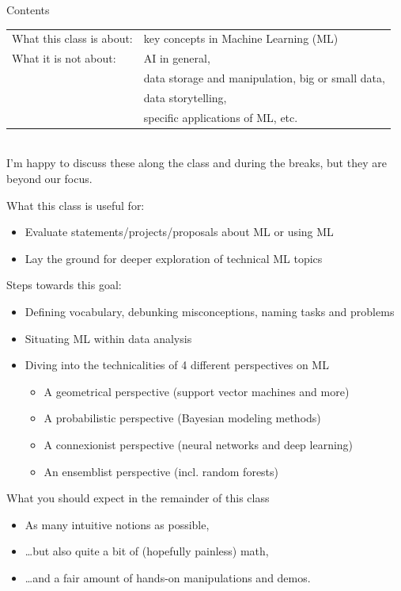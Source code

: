 \documentclass[10pt,a4paper,t,aspectratio=1610,dvipsnames]{beamer}
\begin{document}
\begin{frame}{Contents}
\begin{tabular}{@{}ll}
	What this class is about: & key concepts in Machine Learning (ML)\\
	What it is not about: & AI in general,\\
	& data storage and manipulation, big or small data,\\
	& data storytelling,\\
	& specific applications of ML, etc.
\end{tabular}\\
I'm happy to discuss these along the class and during the breaks, but they are beyond our focus.

\vspace{2em}
\indent What this class is useful for:
\begin{itemize}
	\item[] Evaluate statements/projects/proposals about ML or using ML
	\item[] Lay the ground for deeper exploration of technical ML topics
\end{itemize}

\vspace{2em}
Steps towards this goal:
\begin{itemize}
	\item Defining vocabulary, debunking misconceptions, naming tasks and problems
	\item Situating ML within data analysis
	\item Diving into the technicalities of 4 different perspectives on ML
	\begin{itemize}
		\item A geometrical perspective (support vector machines and more)
		\item A probabilistic perspective (Bayesian modeling methods)
		\item A connexionist perspective (neural networks and deep learning)
		\item An ensemblist perspective (incl. random forests)
	\end{itemize}
\end{itemize}
\end{frame}

\begin{frame}{What you should expect in the remainder of this class}
\begin{itemize}
	\item As many intuitive notions as possible,
	\item \ldots but also quite a bit of (hopefully painless) math,\\
	\item \ldots and a fair amount of hands-on manipulations and demos.
\end{itemize}
\end{frame}
\end{document}
